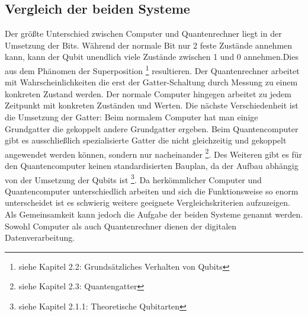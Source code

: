 \documentclass[12pt]{report}
\begin{document}
	\subsection{Vergleich der beiden Systeme}
Der größte Unterschied zwischen Computer und Quantenrechner liegt in der Umsetzung der Bits. Während der normale Bit nur 2 feste Zustände annehmen kann, kann der Qubit unendlich viele Zustände zwischen 1 und 0 annehmen.Dies aus dem Phänomen der Superposition \footnote{siehe Kapitel 2.2: Grundsätzliches Verhalten von Qubits} resultieren. Der Quantenrechner arbeitet mit Wahrscheinlichkeiten die erst der Gatter-Schaltung durch Messung zu einem konkreten Zustand werden. Der normale Computer hingegen arbeitet zu jedem Zeitpunkt mit konkreten Zuständen und Werten. Die nächste Verschiedenheit ist die Umsetzung der Gatter: Beim normalem Computer hat man einige Grundgatter die gekoppelt andere Grundgatter ergeben. Beim Quantencomputer gibt es ausschließlich spezialisierte Gatter die nicht gleichzeitig und gekoppelt angewendet werden können, sondern nur nacheinander \footnote{siehe Kapitel 2.3: Quantengatter}. Des Weiteren gibt es für den Quantencomputer keinen standardisierten Bauplan, da der Aufbau abhängig von der Umsetzung der Qubits ist \footnote{siehe Kapitel 2.1.1: Theoretische Qubitarten}.
Da herkömmlicher Computer und Quantencomputer unterschiedlich arbeiten und sich die Funktionsweise so enorm unterscheidet ist es schwierig weitere geeignete Vergleichskriterien aufzuzeigen. Als Gemeinsamkeit kann jedoch die Aufgabe der beiden Systeme genannt werden. Sowohl Computer als auch Quantenrechner dienen der digitalen Datenverarbeitung.
\newpage
\end{document}
